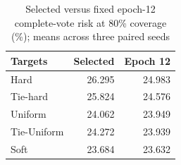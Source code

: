 \begin{table}[t]
\caption{Selected versus fixed epoch-12 complete-vote risk at 80\% coverage (\%); means across three paired seeds}\label{tab:sensitivity}
\centering\begin{tabular}{lrr}\toprule
Targets & Selected & Epoch 12\\\midrule
Hard & 26.295 & 24.983\\
Tie-hard & 25.824 & 24.576\\
Uniform & 24.062 & 23.949\\
Tie-Uniform & 24.272 & 23.939\\
Soft & 23.684 & 23.632\\
\bottomrule\end{tabular}

\end{table}
